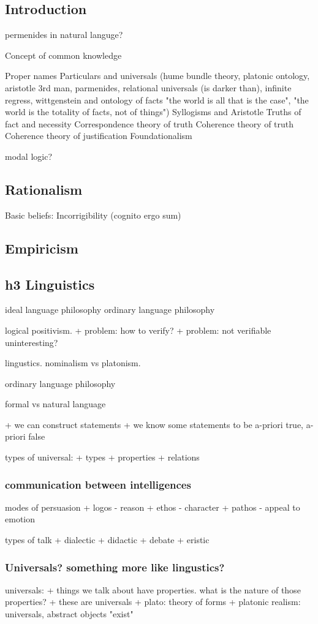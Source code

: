
\subsection{Introduction}

permenides in natural languge?

Concept of common knowledge

Proper names
Particulars and universals (hume bundle theory, platonic ontology, aristotle 3rd man, parmenides, relational universals (is darker than), infinite regress, wittgenstein and ontology of facts "the world is all that is the case", "the world is the totality of facts, not of things")
Syllogisms and Aristotle
Truths of fact and necessity
Correspondence theory of truth
Coherence theory of truth
Coherence theory of justification
Foundationalism

modal logic?

\subsection{Rationalism}
Basic beliefs: Incorrigibility (cognito ergo sum)
\subsection{Empiricism}
\subsection{h3 Linguistics}
ideal language philosophy
ordinary language philosophy

logical positivism.
+ problem: how to verify?
+ problem: not verifiable uninteresting?

lingustics. nominalism vs platonism.

ordinary language philosophy

formal vs natural language

+ we can construct statements
+ we know some statements to be a-priori true, a-priori false

types of universal:
+ types
+ properties
+ relations
\subsubsection{communication between intelligences}
modes of persuasion
+ logos - reason
+ ethos - character
+ pathos - appeal to emotion

types of talk
+ dialectic
+ didactic
+ debate
+ eristic
\subsubsection{Universals? something more like lingustics?}
universals:
+ things we talk about have properties. what is the nature of those properties?
+ these are universals
+ plato: theory of forms
+ platonic realism: universals, abstract objects "exist"


